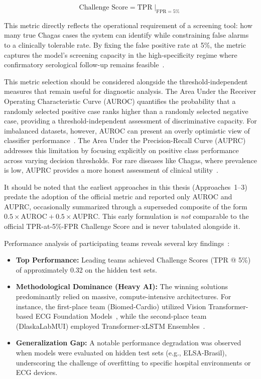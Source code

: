\begin{equation}
\text{Challenge Score} = \text{TPR} \mid_{\text{FPR} = 5\%}
\end{equation}

This metric directly reflects the operational requirement of a screening tool: how many true Chagas cases the system can identify while constraining false alarms to a clinically tolerable rate. By fixing the false positive rate at 5\%, the metric captures the model's screening capacity in the high-specificity regime where confirmatory serological follow-up remains feasible~\cite{reyna2024detection}.

This metric selection should be considered alongside the threshold-independent measures that remain useful for diagnostic analysis. The Area Under the Receiver Operating Characteristic Curve (AUROC) quantifies the probability that a randomly selected positive case ranks higher than a randomly selected negative case, providing a threshold-independent assessment of discriminative capacity. For imbalanced datasets, however, AUROC can present an overly optimistic view of classifier performance~\cite{sameni2025geometry}. The Area Under the Precision-Recall Curve (AUPRC) addresses this limitation by focusing explicitly on positive class performance across varying decision thresholds. For rare diseases like Chagas, where prevalence is low, AUPRC provides a more honest assessment of clinical utility~\cite{sameni2025geometry}.

It should be noted that the earliest approaches in this thesis (Approaches~1--3) predate the adoption of the official metric and reported only AUROC and AUPRC, occasionally summarized through a superseded composite of the form $0.5 \times \text{AUROC} + 0.5 \times \text{AUPRC}$. This early formulation is \textit{not} comparable to the official TPR-at-5\%-FPR Challenge Score and is never tabulated alongside it.

Performance analysis of participating teams reveals several key findings~\cite{reyna2024detection}:

\begin{itemize}
    \item \textbf{Top Performance:} Leading teams achieved Challenge Scores (TPR @ 5\%) of approximately 0.32 on the hidden test sets.
    \item \textbf{Methodological Dominance (Heavy AI):} The winning solutions predominantly relied on massive, compute-intensive architectures. For instance, the first-place team (Biomed-Cardio) utilized Vision Transformer-based ECG Foundation Models~\cite{santvliet2025detecting}, while the second-place team (DlaskaLabMUI) employed Transformer-xLSTM Ensembles~\cite{nicolson2025transformer}.
    \item \textbf{Generalization Gap:} A notable performance degradation was observed when models were evaluated on hidden test sets (e.g., ELSA-Brasil), underscoring the challenge of overfitting to specific hospital environments or ECG devices.
\end{itemize}


